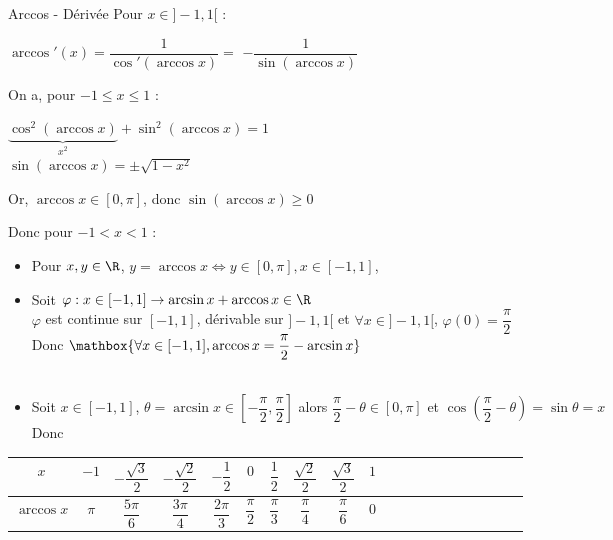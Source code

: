 \documentclass[12pt,a4paper]{report}
\begin{document}
\begin{propositions}{Arccos - Dérivée}{}
Pour $x\in ]-1,1[$ : 
\begin{center}
    $\arccos'(x) = \dfrac{1}{\cos'(\arccos x)} = $ $ - \dfrac{1}{\sin(\arccos x)}$
\end{center}
On a, pour $-1 \leq x \leq 1$ : 
\begin{center}
    $\underbrace{\cos^2(\arccos x)}_{x^2}+\sin^2(\arccos x)=1$\\
    $\sin (\arccos x) = \pm \sqrt{1-x^2}$
\end{center}
Or, $\arccos x \in \left[0, \pi\right]$, donc $\sin (\arccos x)\geq 0$
\begin{center}
\end{center}
Donc pour $-1<x<1$ : 
\end{propositions}

\begin{remarque}
\begin{itemize}
    \item Pour $x,y \in \R$, $y= \arccos x \Longleftrightarrow y\in [0,\pi], x \in [-1,1]$, 
    \item Soit $\varphi : x \in [-1,1] \to \arcsin x + \arccos x \in \R$\\
    $\varphi$ est continue sur $[-1,1]$, dérivable sur $]-1,1[$ et $\forall x \in ]-1,1[$, $\varphi(0)=\dfrac{\pi}{2}$\\
    Donc $\mathbox{\forall x \in [-1,1], \arccos x = \dfrac{\pi}{2} - \arcsin x}$\\
    \\
    \item Soit $x \in [-1,1]$, $\theta=\arcsin x \in \left[-\dfrac{\pi}{2}, \dfrac{\pi}{2}\right]$ alors $\dfrac{\pi}{2}-\theta \in [0,\pi]$ et $\cos \left (\dfrac{\pi}{2} - \theta\right)=\sin \theta = x$\\
    Donc 
\end{itemize}
\end{remarque}

\begin{remarque}
\begin{center}
    \begin{tabular}{|Sc|Sc|Sc|Sc|Sc|Sc|Sc|Sc|Sc|Sc|}
      \hline
      $x$ & $-1$ & $-\dfrac{\sqrt{3}}{2}$ & $-\dfrac{\sqrt{2}}{2}$ & $-\dfrac{1}{2}$ & $0$ & $\dfrac{1}{2}$ & $\dfrac{\sqrt{2}}{2}$ & $\dfrac{\sqrt{3}}{2}$ & $1$\\
      \hline
      $\arccos x$ & $\pi$ & $\dfrac{5\pi}{6}$ & $\dfrac{3\pi}{4}$ & $\dfrac{2\pi}{3}$ & $\dfrac{\pi}{2}$ & $\dfrac{\pi}{3}$ & $\dfrac{\pi}{4}$ & $\dfrac{\pi}{6}$ & $0$\\
      \hline
     \end{tabular}
     \\
\end{center}
\end{remarque}
\end{document}
